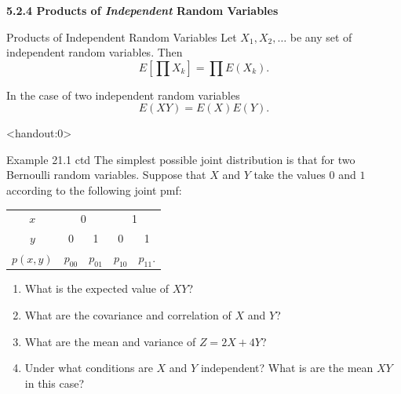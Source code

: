 \begin{frame}
  \frametitle{}
  
  \begin{center}
    \Large{\textbf{5.2.4 Products of \textit{Independent} Random Variables}}
  \end{center}
  
\end{frame}

\begin{frame}
  \begin{block}{Products of Independent Random Variables}
    Let $X_1,X_2,\ldots$ be any set of independent random variables. Then 
    \[
    E\left[\prod X_k \right]=\prod E(X_k).
    \]
    
    \bigskip
    
    In the case of two independent random variables
    \[
      E(XY)=E(X)E(Y). 
    \]
    
  \end{block}
\end{frame}

\begin{frame}<handout:0>
  \begin{block}{Example 21.1 ctd}
    The simplest possible joint distribution is that for two Bernoulli random variables. Suppose that $X$ and $Y$ take the values $0$ and $1$ according to the following joint pmf:

    \begin{center}
      \begin{tabular}{c|cccc}
        $x$ & \multicolumn{2}{c}{0} & \multicolumn{2}{c}{1}\\
        $y$ & 0 & 1 & 0 & 1\\
        \hline
        $p(x,y)$ & $p_{00}$ & $p_{01}$ & $p_{10}$ & $p_{11}$.
      \end{tabular}
    \end{center}

    \begin{enumerate}
    \item What is the expected value of $XY$?
    \item What are the covariance and correlation of $X$ and $Y$?
    \item What are the mean and variance of $Z=2X + 4Y$?
    \item Under what conditions are $X$ and $Y$ independent? What is are the mean $XY$ in this case?
    \end{enumerate}
  \end{block}
\end{frame}

